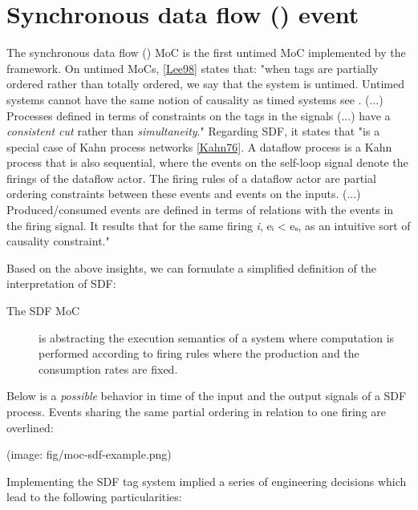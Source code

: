 \section{Synchronous data flow () event}
The synchronous data flow () MoC is the first untimed MoC
 implemented by the  framework. On untimed MoCs,
 \href{ForSyDe-Atom.html#lee98}{[Lee98]} states that: "when tags are
 partially ordered rather than totally ordered, we say that the
 system is untimed. Untimed systems cannot have the same notion of
 causality as timed systems {}see . (...)
 Processes defined in terms of constraints on the tags in the
 signals (...) have a \emph{consistent cut} rather than
 \emph{simultaneity}."  Regarding SDF, it states that "is a special
 case of Kahn process networks
 \href{ForSyDe-Atom.html#kahn76}{[Kahn76]}. A dataflow process is a Kahn
 process that is also sequential, where the events on the
 self-loop signal denote the firings of the dataflow actor. The
 firing rules of a dataflow actor are partial ordering constraints
 between these events and events on the inputs. (...)
 Produced/consumed events are defined in terms of relations with
 the events in the firing signal. It results that for the same
 firing \emph{i}, eᵢ < eₒ, as an intuitive sort of
 causality constraint."\par
Based on the above insights, we can formulate a simplified
 definition of the  interpretation of SDF:\par
\begin{description}
\item[The SDF MoC] is abstracting the execution semantics of a system
 where computation is performed according to firing rules where
 the production and the consumption rates are fixed.
\end{description}Below is a \emph{possible} behavior in time of the input and the
 output signals of a SDF process. Events sharing the same partial
 ordering in relation to one firing are overlined:\par
                 (image: fig/moc-sdf-example.png)\par
                 Implementing the SDF tag system implied a series of engineering
 decisions which lead to the following particularities:\par
